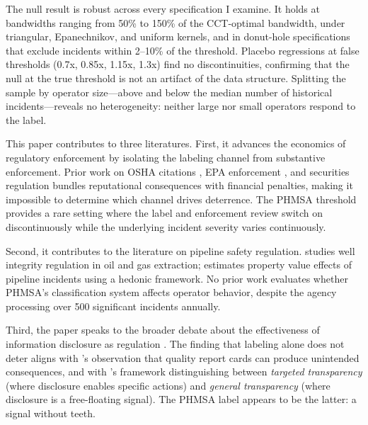 \documentclass[12pt]{article}
\begin{document}
The null result is robust across every specification I examine. It holds at bandwidths ranging from 50\% to 150\% of the CCT-optimal bandwidth, under triangular, Epanechnikov, and uniform kernels, and in donut-hole specifications that exclude incidents within 2--10\% of the threshold. Placebo regressions at false thresholds (0.7x, 0.85x, 1.15x, 1.3x) find no discontinuities, confirming that the null at the true threshold is not an artifact of the data structure. Splitting the sample by operator size---above and below the median number of historical incidents---reveals no heterogeneity: neither large nor small operators respond to the label.

This paper contributes to three literatures. First, it advances the economics of regulatory enforcement \citep{shimshack2007enforce, gray2005effectiveness, duflo2013truth, johnson2020regulation} by isolating the labeling channel from substantive enforcement. Prior work on OSHA citations \citep{ko2010does}, EPA enforcement \citep{gray2005effectiveness}, and securities regulation \citep{karpoff2005reputational} bundles reputational consequences with financial penalties, making it impossible to determine which channel drives deterrence. The PHMSA threshold provides a rare setting where the label and enforcement review switch on discontinuously while the underlying incident severity varies continuously.

Second, it contributes to the literature on pipeline safety regulation. \citet{boomhower2019drilling} studies well integrity regulation in oil and gas extraction; \citet{kube2024pipeline} estimates property value effects of pipeline incidents using a hedonic framework. No prior work evaluates whether PHMSA's classification system affects operator behavior, despite the agency processing over 500 significant incidents annually.

Third, the paper speaks to the broader debate about the effectiveness of information disclosure as regulation \citep{jin2003production, dranove2003more, bennear2013information}. The finding that labeling alone does not deter aligns with \citet{dranove2003more}'s observation that quality report cards can produce unintended consequences, and with \citet{bennear2013information}'s framework distinguishing between \textit{targeted transparency} (where disclosure enables specific actions) and \textit{general transparency} (where disclosure is a free-floating signal). The PHMSA label appears to be the latter: a signal without teeth.
\end{document}
